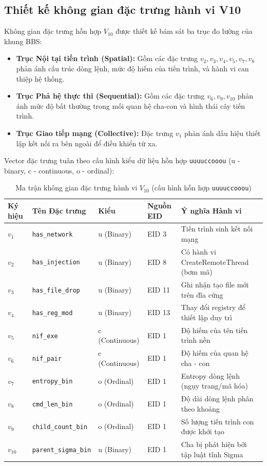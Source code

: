 \documentclass[../main.tex]{subfiles}
\begin{document}
\subsection{Thiết kế không gian đặc trưng hành vi V10}
Không gian đặc trưng hỗn hợp $V_{10}$ được thiết kế bám sát ba trục đo lường của khung BBS:
\begin{itemize}
    \item \textbf{Trục Nội tại tiến trình (Spatial):} Gồm các đặc trưng $v_2, v_3, v_4, v_5, v_7, v_8$ phản ánh cấu trúc dòng lệnh, mức độ hiếm của tiến trình, và hành vi can thiệp hệ thống.
    \item \textbf{Trục Phả hệ thực thi (Sequential):} Gồm các đặc trưng $v_6, v_9, v_{10}$ phản ánh mức độ bất thường trong mối quan hệ cha-con và hình thái cây tiến trình.
    \item \textbf{Trục Giao tiếp mạng (Collective):} Đặc trưng $v_1$ phản ánh dấu hiệu thiết lập kết nối ra bên ngoài để điều khiển từ xa.
\end{itemize}

Vector đặc trưng tuân theo cấu hình kiểu dữ liệu hỗn hợp \texttt{uuuuccooou} (u - binary, c - continuous, o - ordinal):
\begin{table}[H]
\centering
\small
\setlength{\tabcolsep}{4pt}
\caption{Ma trận không gian đặc trưng hành vi $V_{10}$ (cấu hình hỗn hợp \texttt{uuuuccooou})}
\label{tab:v10_space}
\begin{tabular}{|>{\centering\arraybackslash}p{1.0cm}|p{4.0cm}|p{1.8cm}|p{1.8cm}|p{4.6cm}|}
\hline
\textbf{Ký hiệu} & \textbf{Tên Đặc trưng} & \textbf{Kiểu} & \textbf{Nguồn EID} & \textbf{Ý nghĩa Hành vi} \\ \hline
$v_1$ & \texttt{has\_network} & u (Binary) & EID 3 & Tiến trình sinh kết nối mạng \\ \hline
$v_2$ & \texttt{has\_injection} & u (Binary) & EID 8 & Có hành vi CreateRemoteThread (bơm mã) \\ \hline
$v_3$ & \texttt{has\_file\_drop} & u (Binary) & EID 11 & Ghi nhận tạo file mới trên đĩa cứng \\ \hline
$v_4$ & \texttt{has\_reg\_mod} & u (Binary) & EID 13 & Thay đổi registry để thiết lập duy trì \\ \hline
$v_5$ & \texttt{nif\_exe} & c (Continuous) & EID 1 & Độ hiếm của tên tiến trình nền \\ \hline
$v_6$ & \texttt{nif\_pair} & c (Continuous) & EID 1 & Độ hiếm của quan hệ cha - con \\ \hline
$v_7$ & \texttt{entropy\_bin} & o (Ordinal) & EID 1 & Entropy dòng lệnh (ngụy trang/mã hóa) \\ \hline
$v_8$ & \texttt{cmd\_len\_bin} & o (Ordinal) & EID 1 & Độ dài dòng lệnh phân theo khoảng \\ \hline
$v_9$ & \texttt{child\_count\_bin} & o (Ordinal) & EID 1 & Số lượng tiến trình con được khởi tạo \\ \hline
$v_{10}$ & \texttt{parent\_sigma\_bin} & u (Binary) & EID 1 & Cha bị phát hiện bởi tập luật tĩnh Sigma \\ \hline
\end{tabular}
\end{table}
\end{document}
